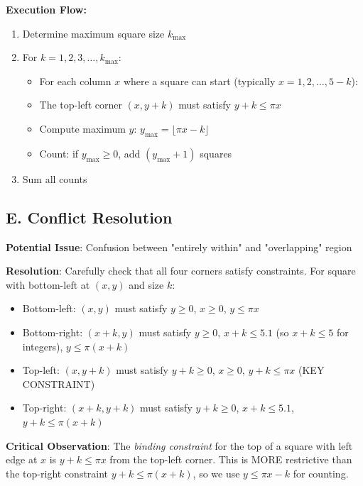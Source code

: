\documentclass[12pt]{article}
\begin{document}
\begin{conversionbox}
\textbf{Execution Flow:}
\begin{enumerate}
    \item Determine maximum square size $k_{\max}$
    \item For $k = 1, 2, 3, \ldots, k_{\max}$:
    \begin{itemize}
        \item For each column $x$ where a square can start (typically $x = 1, 2, \ldots, 5-k$):
        \item The top-left corner $(x, y+k)$ must satisfy $y+k \leq \pi x$
        \item Compute maximum $y$: $y_{\max} = \lfloor \pi x - k \rfloor$
        \item Count: if $y_{\max} \geq 0$, add $(y_{\max} + 1)$ squares
    \end{itemize}
    \item Sum all counts
\end{enumerate}

\subsection*{E. Conflict Resolution}

\textbf{Potential Issue}: Confusion between "entirely within" and "overlapping" region

\textbf{Resolution}: Carefully check that all four corners satisfy constraints. For square with bottom-left at $(x,y)$ and size $k$:
\begin{itemize}
    \item Bottom-left: $(x, y)$ must satisfy $y \geq 0$, $x \geq 0$, $y \leq \pi x$
    \item Bottom-right: $(x+k, y)$ must satisfy $y \geq 0$, $x+k \leq 5.1$ (so $x+k \leq 5$ for integers), $y \leq \pi(x+k)$
    \item Top-left: $(x, y+k)$ must satisfy $y+k \geq 0$, $x \geq 0$, $\boxed{y+k \leq \pi x}$ (KEY CONSTRAINT)
    \item Top-right: $(x+k, y+k)$ must satisfy $y+k \geq 0$, $x+k \leq 5.1$, $y+k \leq \pi(x+k)$
\end{itemize}

\textbf{Critical Observation}: The \textit{binding constraint} for the top of a square with left edge at $x$ is $y+k \leq \pi x$ from the top-left corner. This is MORE restrictive than the top-right constraint $y+k \leq \pi(x+k)$, so we use $y \leq \pi x - k$ for counting.
\end{conversionbox}
\end{document}
